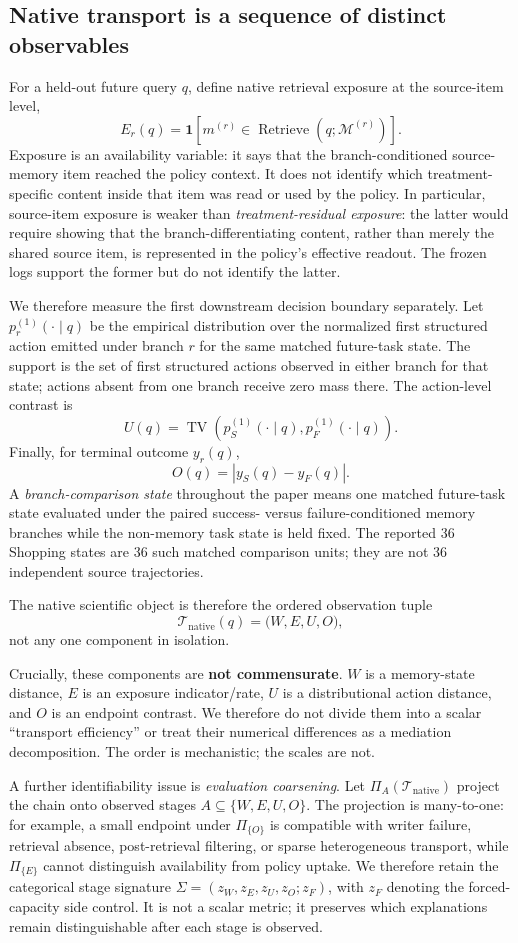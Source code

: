 \subsection{Native transport is a sequence of distinct observables}
For a held-out future query $q$, define native retrieval exposure at the source-item level,
\[
 E_r(q)=\mathbf{1}[m^{(r)}\in\operatorname{Retrieve}(q;\mathcal{M}^{(r)})].
\]
Exposure is an availability variable: it says that the branch-conditioned source-memory item reached the policy context. It does not identify which treatment-specific content inside that item was read or used by the policy. In particular, source-item exposure is weaker than \emph{treatment-residual exposure}: the latter would require showing that the branch-differentiating content, rather than merely the shared source item, is represented in the policy's effective readout. The frozen logs support the former but do not identify the latter.

We therefore measure the first downstream decision boundary separately. Let $p_r^{(1)}(\cdot\mid q)$ be the empirical distribution over the normalized first structured action emitted under branch $r$ for the same matched future-task state. The support is the set of first structured actions observed in either branch for that state; actions absent from one branch receive zero mass there. The action-level contrast is
\[
 U(q)=\operatorname{TV}\!\left(p_S^{(1)}(\cdot\mid q),p_F^{(1)}(\cdot\mid q)\right).
\]
Finally, for terminal outcome $y_r(q)$,
\[
 O(q)=\left|y_S(q)-y_F(q)\right|.
\]
A \emph{branch-comparison state} throughout the paper means one matched future-task state evaluated under the paired success- versus failure-conditioned memory branches while the non-memory task state is held fixed. The reported 36 Shopping states are 36 such matched comparison units; they are not 36 independent source trajectories.

The native scientific object is therefore the ordered observation tuple
\[
 \mathcal{T}_{\mathrm{native}}(q)=\big(W, E, U, O\big),
\]
not any one component in isolation.

Crucially, these components are \textbf{not commensurate}. $W$ is a memory-state distance, $E$ is an exposure indicator/rate, $U$ is a distributional action distance, and $O$ is an endpoint contrast. We therefore do not divide them into a scalar ``transport efficiency'' or treat their numerical differences as a mediation decomposition. The order is mechanistic; the scales are not.

A further identifiability issue is \emph{evaluation coarsening}. Let $\Pi_A(\mathcal{T}_{\mathrm{native}})$ project the chain onto observed stages $A\subseteq\{W,E,U,O\}$. The projection is many-to-one: for example, a small endpoint under $\Pi_{\{O\}}$ is compatible with writer failure, retrieval absence, post-retrieval filtering, or sparse heterogeneous transport, while $\Pi_{\{E\}}$ cannot distinguish availability from policy uptake. We therefore retain the categorical stage signature $\Sigma=(z_W,z_E,z_U,z_O;z_F)$, with $z_F$ denoting the forced-capacity side control. It is not a scalar metric; it preserves which explanations remain distinguishable after each stage is observed.

